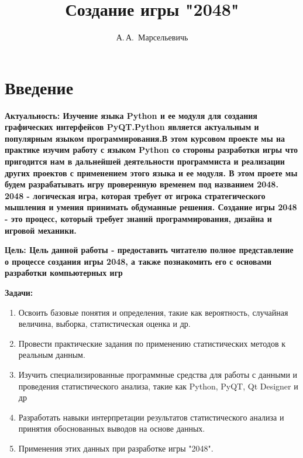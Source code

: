 \documentclass[14pt, oneside]{altsu-report}
\title{Создание игры "2048"}
\author{А.\,А.~Марсельевичь}
\institute{Институт цифровых технологий, электроники и физики}
\date{\the\year}
\begin{document}
\maketitle

\setcounter{page}{2}
\makeabstract
\tableofcontents

\chapter*{Введение}
\newline
\textbf{Актуальность:
Изучение языка Python и ее модуля для создания графических  интерфейсов PyQT.Python является актуальным и популярным языком программирования.В этом курсовом проекте мы на практике изучим работу с языком Python со стороны разработки игры что пригодится нам в дальнейшей деятельности программиста и реализации других проектов с применением этого языка и ее модуля.
В этом проете мы будем разрабатывать игру проверенную временем под названием 2048. 2048 - логическая игра, которая требует от игрока стратегического мышления и умения принимать обдуманные решения. Создание игры 2048 - это процесс, который требует знаний программирования, дизайна и игровой механики.}

\textbf{Цель:
Цель данной работы - предоставить читателю полное представление о процессе создания игры 2048, а также познакомить его с основами разработки компьютерных игр}

\textbf{Задачи:}
\begin{enumerate}
\item  Освоить базовые понятия и определения, такие как вероятность, случайная величина, выборка, статистическая оценка и др.
\item Провести практические задания по применению статистических методов к реальным данным.
\item Изучить специализированные программные средства для работы с данными и проведения статистического анализа, такие как  Python, PyQT, Qt Designer и др
\item Разработать навыки интерпретации результатов статистического анализа и принятия обоснованных выводов на основе данных.
\item Применения этих данных при разработке игры "2048".
\end{enumerate}




\end{document}
